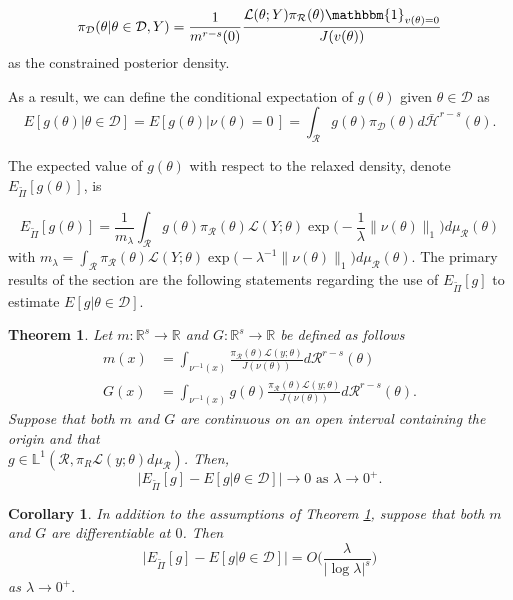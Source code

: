 \documentclass[10pt,fleqn]{article} \pdfoutput=1
\newtheorem{theorem}{Theorem} \newtheorem{lemma}{Lemma}
\newtheorem{corollary}{Corollary} \newtheorem{remark}{Remark}
\DeclareMathOperator{\1}{\mathbbm{1}} \DeclareMathOperator{\bigO}{\mc O}
\begin{document}
\begin{equation} \label{EQ:Constrained_rcp}
	\pi_\mathcal{D}(\theta|\theta\in\mathcal{D},Y) = \frac{1}{m^{r-s}({0})}
	\frac{\mathcal{L}(\theta; Y) \pi_\mathcal{R}(\theta)
	\mathbbm{1}_{v(\theta)={0}}}{J(v(\theta))} \end{equation} as the
constrained posterior density.

 As a result, we
can define the conditional  expectation of $g(\theta)$ given $\theta \in
	\mathcal{D}$ as $$E[g(\theta) | \theta\in\mathcal{D}] = E[g(\theta) |
			\nu(\theta) =0\,] = \int_\mathcal{R} g(\theta) \pi_\mathcal{D}(\theta)
	d\bar{\mathcal{H}}^{r-s}(\theta).$$

The expected value of
$g(\theta)$ with respect to the relaxed density, denote
$E_{\tilde{\Pi}}[g(\theta)] $, is

$$		E_{\tilde{\Pi}}[g(\theta)] = \frac{1}{m_\lambda}
		\int_\mathcal{R} g(\theta) \pi_\mathcal{R}(\theta)
		\mathcal{L}(Y;\theta)\exp\bigg(-\frac{1}{\lambda}\|\nu (\theta)\|_1\bigg)
		d\mu_\mathcal{R}(\theta) $$
		with $m_\lambda =
	\int_\mathcal{R}  \pi_\mathcal{R}(\theta)
	\mathcal{L}(Y;\theta)\exp\bigg(-{\lambda^{-1}}\|\nu (\theta)\|_1\bigg)
	d\mu_\mathcal{R}(\theta).$
The primary results of the section are the following statements regarding
the use of $E_{\tilde{\Pi}}[g]$ to estimate $E[g|\theta\in\mathcal{D}]$.

\begin{theorem} \label{THM:Relaxed_Expectation_Convergence_Measure_Zero}
	Let $m:\mathbb{R}^s\to \mathbb{R}$ and $G:\mathbb{R}^s\to
		\mathbb{R}$ be defined as follows \begin{align*} m(x) & =
		\int_{\nu^{-1}(x)} \frac{\pi_\mathcal{R}(\theta)
			\mathcal{L}(y;\theta)}{J(\nu(\theta))}
		d\mathcal{R}^{r-s}(\theta) \\ G(x) &= \int_{\nu^{-1}(x)}
		g(\theta)\frac{\pi_\mathcal{R}(\theta)
			\mathcal{L}(y;\theta)}{J(\nu(\theta))} d\mathcal{R}^{r-s}(\theta).
	\end{align*} Suppose that both $m$ and $G$ are continuous on an open
	interval containing the origin and that \\
	$g\in\mathbb{L}^1(\mathcal{R},\pi_R\mathcal{L}(y;\theta)d\mu_\mathcal{R})$.
	Then, $$\bigg|E_{\tilde{\Pi}}[g] - E[g|\theta \in \mathcal{D}]\bigg| \to 0
		\text{ as } \lambda\to 0^+.$$ \end{theorem}

\begin{corollary} In addition to the assumptions of Theorem
	\ref{THM:Relaxed_Expectation_Convergence_Measure_Zero}, suppose
	that both $m$ and $G$ are differentiable at $0$. Then
	$$\bigg|E_{\tilde{\Pi}}[g] - E[g|\theta \in \mathcal{D}] \bigg| =
		O\bigg(\frac{\lambda}{|\log \lambda|^s}\bigg)$$ as $\lambda \to
		0^+.$ \end{corollary}
\end{document}
